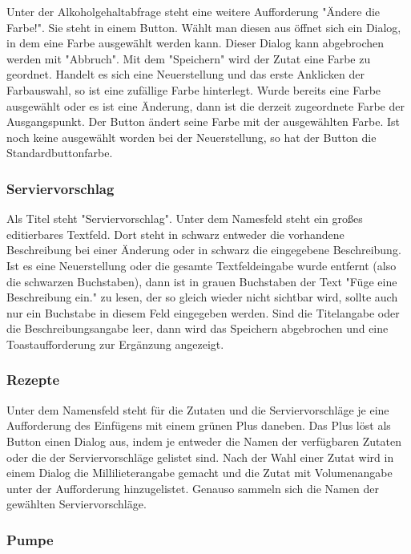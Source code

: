 Unter der Alkoholgehaltabfrage steht eine weitere Aufforderung "Ändere die Farbe!". Sie steht in einem Button. Wählt man diesen aus öffnet sich ein Dialog, in dem eine Farbe ausgewählt werden kann. Dieser Dialog kann abgebrochen werden mit "Abbruch". Mit dem "Speichern" wird der Zutat eine Farbe zu geordnet. Handelt es sich eine Neuerstellung und das erste Anklicken der Farbauswahl, so ist eine zufällige Farbe hinterlegt. Wurde bereits eine Farbe ausgewählt oder es ist eine Änderung, dann ist die derzeit zugeordnete Farbe der Ausgangspunkt. Der Button ändert seine Farbe mit der ausgewählten Farbe. Ist noch keine ausgewählt worden bei der Neuerstellung, so hat der Button die Standardbuttonfarbe.

\subsubsection{Serviervorschlag}

Als Titel steht "Serviervorschlag". Unter dem Namesfeld steht ein großes editierbares Textfeld. Dort steht in schwarz entweder die vorhandene Beschreibung bei einer Änderung oder in schwarz die eingegebene Beschreibung. Ist es eine Neuerstellung oder die gesamte Textfeldeingabe wurde entfernt (also die schwarzen Buchstaben), dann ist in grauen Buchstaben der Text "Füge eine Beschreibung ein." zu lesen, der so gleich wieder nicht sichtbar wird, sollte auch nur ein Buchstabe in diesem Feld eingegeben werden. Sind die Titelangabe oder die Beschreibungsangabe leer, dann wird das Speichern abgebrochen und eine Toastaufforderung zur Ergänzung angezeigt.

\subsubsection{Rezepte}

Unter dem Namensfeld steht für die Zutaten und die Serviervorschläge je eine Aufforderung des Einfügens mit einem grünen Plus daneben. Das Plus löst als Button einen Dialog aus, indem je entweder die Namen der verfügbaren Zutaten oder die der Serviervorschläge gelistet sind. Nach der Wahl einer Zutat wird in einem Dialog die Millilieterangabe gemacht und die Zutat mit Volumenangabe unter der Aufforderung hinzugelistet. Genauso sammeln sich die Namen der gewählten Serviervorschläge.

\subsubsection{Pumpe}


